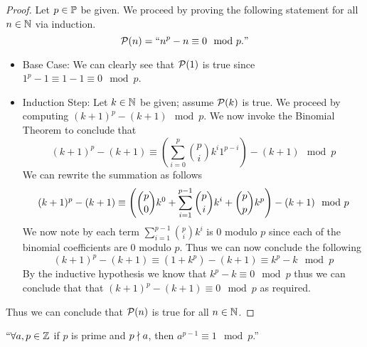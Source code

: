         \begin{proof}
            Let $p \in \mathbb{P}$ be given. We proceed by proving the following statement
            for all $n \in \mathbb{N}$ via induction.
            \[
                \mathcal{P}(n) = ``n^p - n \equiv 0 \mod p."
            \]
            \begin{itemize}
                \item
                    Base Case: We can clearly see that $\mathcal{P}(1)$ is true since
                    $1^p - 1 \equiv 1 - 1 \equiv 0 \mod p$.
                \item
                    Induction Step: Let $k \in \mathbb{N}$ be given; assume $\mathcal{P}(k)$
                    is true. We proceed by computing $(k + 1)^p - (k + 1) \mod p$. We now invoke
                    the Binomial Theorem to conclude that
                    \[
                        (k + 1)^p - (k + 1) \equiv \left(\sum_{i = 0}^p \binom{p}{i} k^i 1^{p - i}\right) - (k + 1) \mod p
                    \]
                    We can rewrite the summation as follows
                    \[
                       (k + 1)^p - (k + 1) \equiv \left(\dbinom{p}{0} k^0 + \sum_{i = 1}^{p - 1} \dbinom{p}{i}k^i + \dbinom{p}{p}k^p\right) - (k + 1) \mod p
                    \]
                    We now note by  each term $\sum_{i = 1}^{p - 1} \binom{p}{i}k^i$ 
                    is 0 modulo $p$ since each of the binomial coefficients are 0 modulo $p$. Thus
                    we can now conclude the following
                    \[
                       (k + 1)^p - (k + 1) \equiv (1 + k^p) - (k + 1) \equiv k^p - k \mod p
                    \]
                    By the inductive hypothesis we know that $k^p - k \equiv 0 \mod p$
                    thus we can conclude that that $(k + 1)^p - (k + 1) \equiv 0 \mod p$
                    as required.
            \end{itemize}
            Thus we can conclude that $\mathcal{P}(n)$ is true for all $n \in \mathbb{N}$. \QED
        \end{proof}
        \begin{theorem}
            $``\forall a, p \in \mathbb{Z}$ if $p$ is prime and $p \nmid a$, then
            $a^{p - 1} \equiv 1 \mod p$.''
            \label{Fermat's Little Theorem}
        \end{theorem}
